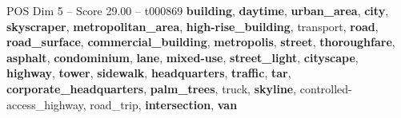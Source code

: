 \begin{textsample}{POS Dim 5 – Score 29.00 – t000869}  \label{ex:f5_pos_001}
\textbf{building}, \textbf{daytime}, \textbf{urban\_area}, \textbf{city}, \textbf{skyscraper}, \textbf{metropolitan\_area}, \textbf{high-rise\_building}, transport, \textbf{road}, \textbf{road\_surface}, \textbf{commercial\_building}, \textbf{metropolis}, \textbf{street}, \textbf{thoroughfare}, \textbf{asphalt}, \textbf{condominium}, \textbf{lane}, \textbf{mixed-use}, \textbf{street\_light}, \textbf{cityscape}, \textbf{highway}, \textbf{tower}, \textbf{sidewalk}, \textbf{headquarters}, \textbf{traffic}, \textbf{tar}, \textbf{corporate\_headquarters}, \textbf{palm\_trees}, truck, \textbf{skyline}, controlled-access\_highway, road\_trip, \textbf{intersection}, \textbf{van}

\end{textsample}
